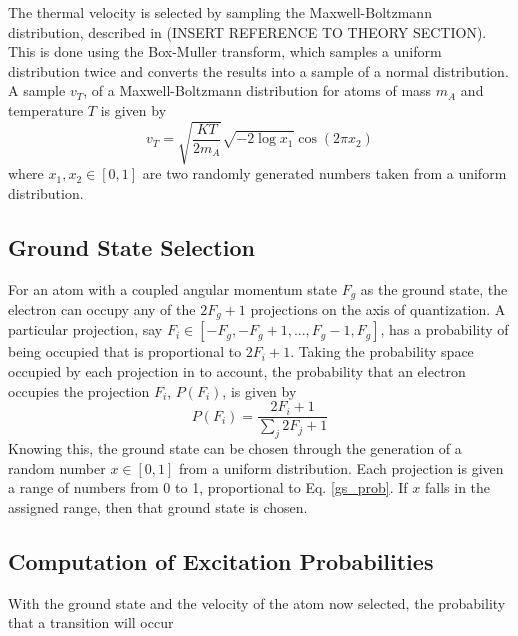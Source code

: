 \documentclass[12pt,a4paper,margin=1in]{report}
\begin{document}
The thermal velocity is selected by sampling the Maxwell-Boltzmann distribution, described in (INSERT REFERENCE TO THEORY SECTION). This is done using the Box-Muller transform, which samples a uniform distribution twice and converts the results into a sample of a normal distribution. A sample $v_T$, of a Maxwell-Boltzmann distribution for atoms of mass $m_A$ and temperature $T$ is given by
\begin{equation}
v_T = \sqrt{\frac{KT}{2m_A}}\sqrt{-2\log x_1}\cos (2\pi x_2)
\end{equation}
where $x_1,x_2 \in [0,1]$ are two randomly generated numbers taken from a uniform distribution.

\subsection{Ground State Selection}
For an atom with a coupled angular momentum state $F_g$ as the ground state, the electron can occupy any of the $2F_g+1$ projections on the axis of quantization. A particular projection, say $F_i \in [-F_g,-F_g+1,...,F_g-1,F_g]$, has a probability of being occupied that is proportional to $2F_i+1$. Taking the probability space occupied by each projection in to account, the probability that an electron occupies the projection $F_i$, $P(F_i)$, is given by
\begin{equation}
P(F_i) = \frac{2F_i+1}{\sum_j 2F_j+1}
\label{gs_prob}
\end{equation}
Knowing this, the ground state can be chosen through the generation of a random number $x \in [0,1]$ from a uniform distribution. Each projection is given a range of numbers from 0 to 1, proportional to Eq. \ref{gs_prob}. If $x$ falls in the assigned range, then that ground state is chosen. 

\subsection{Computation of Excitation Probabilities}
With the ground state and the velocity of the atom now selected, the probability that a transition will occur 
\end{document}
